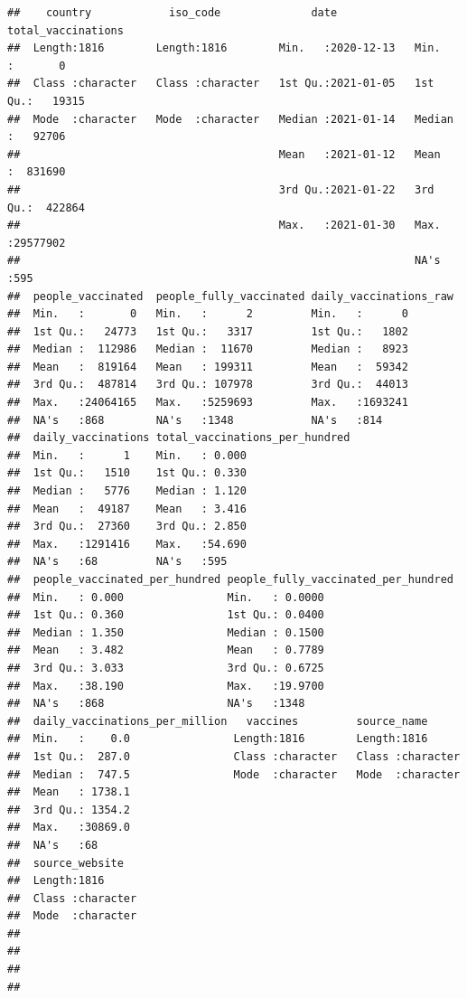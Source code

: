 \documentclass[
]{book}
\begin{document}
\begin{verbatim}
##    country            iso_code              date            total_vaccinations
##  Length:1816        Length:1816        Min.   :2020-12-13   Min.   :       0  
##  Class :character   Class :character   1st Qu.:2021-01-05   1st Qu.:   19315  
##  Mode  :character   Mode  :character   Median :2021-01-14   Median :   92706  
##                                        Mean   :2021-01-12   Mean   :  831690  
##                                        3rd Qu.:2021-01-22   3rd Qu.:  422864  
##                                        Max.   :2021-01-30   Max.   :29577902  
##                                                             NA's   :595       
##  people_vaccinated  people_fully_vaccinated daily_vaccinations_raw
##  Min.   :       0   Min.   :      2         Min.   :      0       
##  1st Qu.:   24773   1st Qu.:   3317         1st Qu.:   1802       
##  Median :  112986   Median :  11670         Median :   8923       
##  Mean   :  819164   Mean   : 199311         Mean   :  59342       
##  3rd Qu.:  487814   3rd Qu.: 107978         3rd Qu.:  44013       
##  Max.   :24064165   Max.   :5259693         Max.   :1693241       
##  NA's   :868        NA's   :1348            NA's   :814           
##  daily_vaccinations total_vaccinations_per_hundred
##  Min.   :      1    Min.   : 0.000                
##  1st Qu.:   1510    1st Qu.: 0.330                
##  Median :   5776    Median : 1.120                
##  Mean   :  49187    Mean   : 3.416                
##  3rd Qu.:  27360    3rd Qu.: 2.850                
##  Max.   :1291416    Max.   :54.690                
##  NA's   :68         NA's   :595                   
##  people_vaccinated_per_hundred people_fully_vaccinated_per_hundred
##  Min.   : 0.000                Min.   : 0.0000                    
##  1st Qu.: 0.360                1st Qu.: 0.0400                    
##  Median : 1.350                Median : 0.1500                    
##  Mean   : 3.482                Mean   : 0.7789                    
##  3rd Qu.: 3.033                3rd Qu.: 0.6725                    
##  Max.   :38.190                Max.   :19.9700                    
##  NA's   :868                   NA's   :1348                       
##  daily_vaccinations_per_million   vaccines         source_name       
##  Min.   :    0.0                Length:1816        Length:1816       
##  1st Qu.:  287.0                Class :character   Class :character  
##  Median :  747.5                Mode  :character   Mode  :character  
##  Mean   : 1738.1                                                     
##  3rd Qu.: 1354.2                                                     
##  Max.   :30869.0                                                     
##  NA's   :68                                                          
##  source_website    
##  Length:1816       
##  Class :character  
##  Mode  :character  
##                    
##                    
##                    
## 
\end{verbatim}
\end{document}
